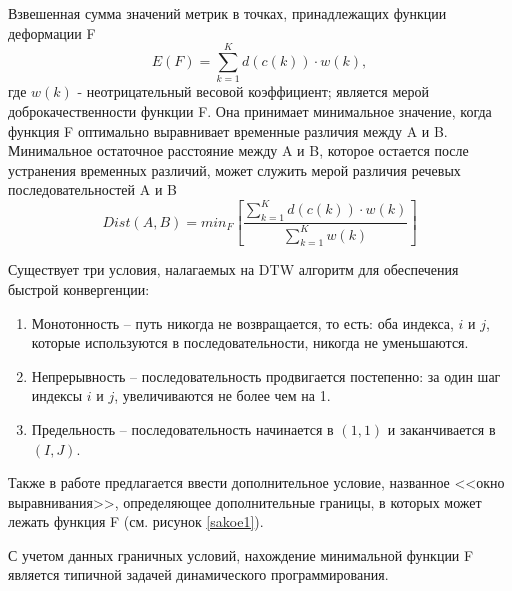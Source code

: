 \documentclass[a4paper,14pt,russian,utf8,nocolumnsxix,nocolumnxxxi,nocolumnxxxii]{eskdtext}
\begin{document}
Взвешенная сумма значений метрик в точках, принадлежащих функции деформации F
\begin{equation}
	E(F)=\sum_{k=1}^{K}{d(c(k))\cdot w(k)},	
\end{equation}
где $w(k)$ - неотрицательный весовой коэффициент;
является мерой доброкачественности функции F. Она принимает минимальное значение, когда функция F оптимально выравнивает временные различия между A и B. Минимальное остаточное расстояние между A и B, которое остается после устранения временных различий, может служить мерой различия речевых последовательностей A и B
\begin{equation}
	Dist(A,B)=min_F\left[\frac{\sum_{k=1}^{K}{d(c(k))\cdot w(k)}}{\sum_{k=1}^{K}{w(k)}}\right]
	\label{eq:dist}
\end{equation}

Существует три условия, налагаемых на DTW алгоритм для обеспечения быстрой конвергенции:

\begin{enumerate}[1)]
 \item Монотонность – путь никогда не возвращается, то есть: оба индекса, $i$ и $j$, которые используются в последовательности, никогда не уменьшаются. 

 \item Непрерывность – последовательность продвигается постепенно: за один шаг индексы $i$ и $j$, увеличиваются не более чем на 1.

 \item Предельность – последовательность начинается в $(1,1)$ и заканчивается в $(I,J)$.
 \end{enumerate}

Также в работе \cite{sakoe} предлагается ввести дополнительное условие, названное <<окно выравнивания>>, определяющее дополнительные границы, в которых может лежать функция F (см. рисунок \ref{sakoe1}).

С учетом данных граничных условий, нахождение минимальной функции F является типичной задачей динамического программирования.
\end{document}
